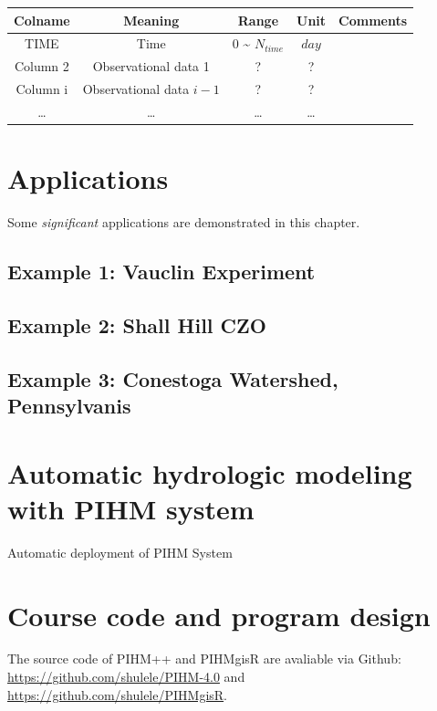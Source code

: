 \documentclass[]{scrbook}
\begin{document}
\begin{longtable}[]{@{}ccccc@{}}
\toprule
Colname & Meaning & Range & Unit & Comments\tabularnewline
\midrule
\endhead
TIME & Time & 0 \textasciitilde{} \(N_{time}\) & \(day\)
&\tabularnewline
Column 2 & Observational data 1 & ? & ? &\tabularnewline
Column i & Observational data \(i-1\) & ? & ? &\tabularnewline
\ldots{} & \ldots{} & \ldots{} & \ldots{} &\tabularnewline
\bottomrule
\end{longtable}

\chapter{Applications}\label{applications}

Some \emph{significant} applications are demonstrated in this chapter.

\section{Example 1: Vauclin
Experiment}\label{example-1-vauclin-experiment}

\section{Example 2: Shall Hill CZO}\label{example-2-shall-hill-czo}

\section{Example 3: Conestoga Watershed,
Pennsylvanis}\label{example-3-conestoga-watershed-pennsylvanis}

\chapter{Automatic hydrologic modeling with PIHM
system}\label{automatic-hydrologic-modeling-with-pihm-system}

Automatic deployment of PIHM System

\chapter{Course code and program
design}\label{course-code-and-program-design}

The source code of PIHM++ and PIHMgisR are avaliable via Github:
\url{https://github.com/shulele/PIHM-4.0} and
\url{https://github.com/shulele/PIHMgisR}.


\end{document}
